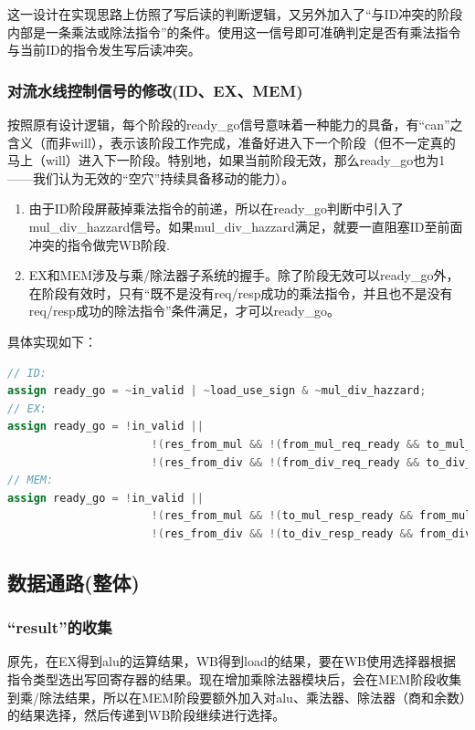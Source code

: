 \documentclass[11pt]{article}
\begin{document}
这一设计在实现思路上仿照了写后读的判断逻辑，又另外加入了“与ID冲突的阶段内部是一条乘法或除法指令”的条件。使用这一信号即可准确判定是否有乘法指令与当前ID的指令发生写后读冲突。


\subsubsection{对流水线控制信号的修改(ID、EX、MEM)}

按照原有设计逻辑，每个阶段的ready_go信号意味着一种能力的具备，有“can”之含义（而非will），表示该阶段工作完成，准备好进入下一个阶段（但不一定真的马上（will）进入下一阶段。特别地，如果当前阶段无效，那么ready_go也为1——我们认为无效的“空穴”持续具备移动的能力）。

\begin{enumerate}
    \item 由于ID阶段屏蔽掉乘法指令的前递，所以在ready_go判断中引入了mul_div_hazzard信号。如果mul_div_hazzard满足，就要一直阻塞ID至前面冲突的指令做完WB阶段.
    \item EX和MEM涉及与乘/除法器子系统的握手。除了阶段无效可以ready_go外，在阶段有效时，只有“既不是没有req/resp成功的乘法指令，并且也不是没有req/resp成功的除法指令”条件满足，才可以ready_go。
\end{enumerate}
具体实现如下：

\begin{lstlisting}[language=Verilog, caption={修改后的ready_go}]
// ID:
assign ready_go = ~in_valid | ~load_use_sign & ~mul_div_hazzard;
// EX:
assign ready_go = !in_valid ||
					  !(res_from_mul && !(from_mul_req_ready && to_mul_req_valid)) &&
					  !(res_from_div && !(from_div_req_ready && to_div_req_valid));
// MEM:
assign ready_go = !in_valid ||
                      !(res_from_mul && !(to_mul_resp_ready && from_mul_resp_valid)) &&
                      !(res_from_div && !(to_div_resp_ready && from_div_resp_valid));
\end{lstlisting}




\subsection{数据通路(整体)}

\subsubsection{“result”的收集}
原先，在EX得到alu的运算结果，WB得到load的结果，要在WB使用选择器根据指令类型选出写回寄存器的结果。现在增加乘除法器模块后，会在MEM阶段收集到乘/除法结果，所以在MEM阶段要额外加入对alu、乘法器、除法器（商和余数）的结果选择，然后传递到WB阶段继续进行选择。
\end{document}
